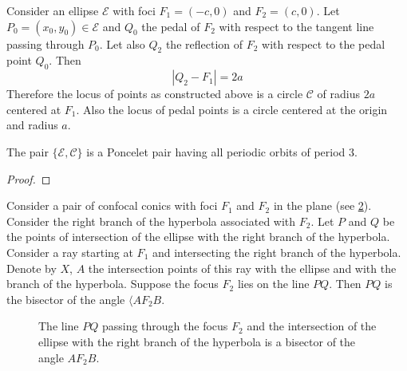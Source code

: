 \begin{proposition} \label{prop:pedal_circle} Consider an ellipse $\mathcal{E}$  with foci $F_1=(-c,0)$ and $F_2=(c,0)$. Let $P_0=(x_0,y_0)\in\mathcal{E}$ and $Q_0$ the pedal of $F_2$ with respect to the tangent line passing through $P_0$. Let also $Q_2$ the reflection of $F_2$ with respect to the pedal point $Q_0$.
	Then \[ |Q_2-F_1|=2a\]
	Therefore the locus of points as constructed above is a circle $\mathcal{C}$  of radius $2a$ centered at $F_1$.
	Also the locus of pedal points is a circle centered at the origin and radius $a$.
	
	The pair $\{\mathcal{E},\mathcal{C}\}$ is a Poncelet pair having all periodic orbits of period 3.
\end{proposition}

\begin{figure}[H]
	\begin{center}
		\def\svgwidth{0.55\textwidth}
		
		\caption {   }
	\end{center}
	\label{fig:elipse_circulo}
\end{figure}
\begin{proof}


\end{proof}


\begin{theorem}
Consider a pair of confocal conics with foci $F_1$ and $F_2$ in the plane (see   \cref{fig:galperin}).
  Consider  the right branch of the hyperbola associated with $F_2$. Let $P$
and $Q$ be the points of intersection of the ellipse with the right branch of the hyperbola.
Consider a ray starting at $F_1$ and intersecting the right branch of the hyperbola. Denote
by $X$, $A$ the intersection points of this ray with the ellipse and with the branch of the
hyperbola. Suppose the focus $F_2$ lies on the line $P Q$. Then $P Q$ is the bisector of the
angle $  \langle  AF_2B$.  
\end{theorem}
\begin{figure}[H]
	\begin{center}
		\def\svgwidth{0.75\textwidth}
 	
		\caption { The line $PQ$ passing through the focus $F_2$ and the intersection of the ellipse with the right branch of the hyperbola  is a bisector of the angle $AF_2B$.}
		 \label{fig:galperin}
	\end{center}
\end{figure}


